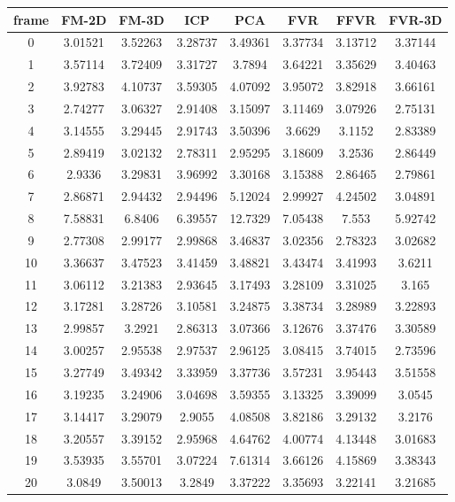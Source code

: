 \begin{figure}
\centering
\begin{tabular}{cccccccc}
\hline
\textbf{frame} & \textbf{FM-2D} & \textbf{FM-3D} & \textbf{ICP} & \textbf{PCA} & \textbf{FVR} & \textbf{FFVR} & \textbf{FVR-3D}
\\ \hline
0 & 3.01521 & 3.52263 & 3.28737 & 3.49361 & 3.37734 & 3.13712 & 3.37144\\
1 & 3.57114 & 3.72409 & 3.31727 & 3.7894 & 3.64221 & 3.35629 & 3.40463\\
2 & 3.92783 & 4.10737 & 3.59305 & 4.07092 & 3.95072 & 3.82918 & 3.66161\\
3 & 2.74277 & 3.06327 & 2.91408 & 3.15097 & 3.11469 & 3.07926 & 2.75131\\
4 & 3.14555 & 3.29445 & 2.91743 & 3.50396 & 3.6629 & 3.1152 & 2.83389\\
5 & 2.89419 & 3.02132 & 2.78311 & 2.95295 & 3.18609 & 3.2536 & 2.86449\\
6 & 2.9336 & 3.29831 & 3.96992 & 3.30168 & 3.15388 & 2.86465 & 2.79861\\
7 & 2.86871 & 2.94432 & 2.94496 & 5.12024 & 2.99927 & 4.24502 & 3.04891\\
8 & 7.58831 & 6.8406 & 6.39557 & 12.7329 & 7.05438 & 7.553 & 5.92742\\
9 & 2.77308 & 2.99177 & 2.99868 & 3.46837 & 3.02356 & 2.78323 & 3.02682\\
10 & 3.36637 & 3.47523 & 3.41459 & 3.48821 & 3.43474 & 3.41993 & 3.6211\\
11 & 3.06112 & 3.21383 & 2.93645 & 3.17493 & 3.28109 & 3.31025 & 3.165\\
12 & 3.17281 & 3.28726 & 3.10581 & 3.24875 & 3.38734 & 3.28989 & 3.22893\\
13 & 2.99857 & 3.2921 & 2.86313 & 3.07366 & 3.12676 & 3.37476 & 3.30589\\
14 & 3.00257 & 2.95538 & 2.97537 & 2.96125 & 3.08415 & 3.74015 & 2.73596\\
15 & 3.27749 & 3.49342 & 3.33959 & 3.37736 & 3.57231 & 3.95443 & 3.51558\\
16 & 3.19235 & 3.24906 & 3.04698 & 3.59355 & 3.13325 & 3.39099 & 3.0545\\
17 & 3.14417 & 3.29079 & 2.9055 & 4.08508 & 3.82186 & 3.29132 & 3.2176\\
18 & 3.20557 & 3.39152 & 2.95968 & 4.64762 & 4.00774 & 4.13448 & 3.01683\\
19 & 3.53935 & 3.55701 & 3.07224 & 7.61314 & 3.66126 & 4.15869 & 3.38343\\
20 & 3.0849 & 3.50013 & 3.2849 & 3.37222 & 3.35693 & 3.22141 & 3.21685\\

\end{tabular}
\end{figure}
